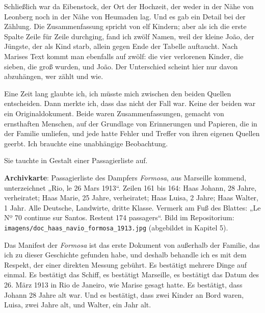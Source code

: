 \documentclass[
  ngerman,
  11pt,
  openany]{book}
\begin{document}
Schließlich war da Eibenstock, der Ort der Hochzeit, der weder in der
Nähe von Leonberg noch in der Nähe von Heumaden lag. Und es gab ein
Detail bei der Zählung. Die Zusammenfassung spricht von elf Kindern;
aber als ich die erste Spalte Zeile für Zeile durchging, fand ich zwölf
Namen, weil der kleine João, der Jüngste, der als Kind starb, allein
gegen Ende der Tabelle auftaucht. Nach Marises Text kommt man ebenfalls
auf zwölf: die vier verlorenen Kinder, die sieben, die groß wurden, und
João. Der Unterschied scheint hier nur davon abzuhängen, wer zählt und
wie.

Eine Zeit lang glaubte ich, ich müsste mich zwischen den beiden Quellen
entscheiden. Dann merkte ich, dass das nicht der Fall war. Keine der
beiden war ein Originaldokument. Beide waren Zusammenfassungen, gemacht
von ernsthaften Menschen, auf der Grundlage von Erinnerungen und
Papieren, die in der Familie umliefen, und jede hatte Fehler und Treffer
von ihren eigenen Quellen geerbt. Ich brauchte eine unabhängige
Beobachtung.

Sie tauchte in Gestalt einer Passagierliste auf.

\begin{ficha}

\textbf{Archivkarte}: Passagierliste des Dampfers \emph{Formosa}, aus
Marseille kommend, unterzeichnet „Rio, le 26 Mars 1913``. Zeilen 161 bis
164: Haas Johann, 28 Jahre, verheiratet; Haas Marie, 25 Jahre,
verheiratet; Haas Luisa, 2 Jahre; Haas Walter, 1 Jahr. Alle Deutsche,
Landwirte, dritte Klasse. Vermerk am Fuß des Blattes: „Le Nº 70 continue
sur Santos. Restent 174 passagers``. Bild im Repositorium:
\texttt{imagens/doc\_haas\_navio\_formosa\_1913.jpg} (abgebildet in
Kapitel 5).

\end{ficha}

Das Manifest der \emph{Formosa} ist das erste Dokument von außerhalb der
Familie, das ich zu dieser Geschichte gefunden habe, und deshalb
behandle ich es mit dem Respekt, der einer direkten Messung gebührt. Es
bestätigt mehrere Dinge auf einmal. Es bestätigt das Schiff, es
bestätigt Marseille, es bestätigt das Datum des 26. März 1913 in Rio de
Janeiro, wie Marise gesagt hatte. Es bestätigt, dass Johann 28 Jahre alt
war. Und es bestätigt, dass zwei Kinder an Bord waren, Luisa, zwei Jahre
alt, und Walter, ein Jahr alt.
\end{document}
